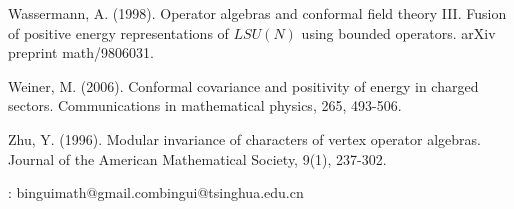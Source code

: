 \documentclass[11pt,b5paper,notitlepage]{article}
\theoremstyle{definition}
\theoremstyle{plain}
\numberwithin{equation}{section}
\begin{document}
\begin{thebibliography}{999999}
Wassermann, A. (1998). Operator algebras and conformal field theory III. Fusion of positive energy representations of $LSU (N)$ using bounded operators. arXiv preprint math/9806031.


Weiner, M. (2006). Conformal covariance and positivity of energy in charged sectors. Communications in mathematical physics, 265, 493-506.


Zhu, Y. (1996). Modular invariance of characters of vertex operator algebras. Journal of the American Mathematical Society, 9(1), 237-302.

		
\end{thebibliography}


: binguimath@gmail.com\qquad bingui@tsinghua.edu.cn
\end{document}
